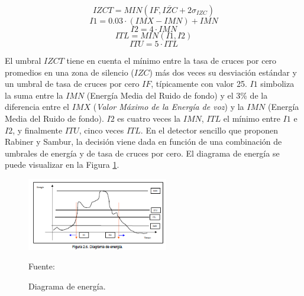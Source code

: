 \begin{enumerate}
\begin{enumerate}
\begin{equation}
\label{eq:ecuacion27}
IZCT = MIN(IF,\overline{IZC} + 2\sigma _{IZC})
\end{equation}
\vskip -1.5cm
\begin{equation}
\label{eq:ecuacion28}
I1 = 0.03\cdot(IMX-IMN) + IMN
\end{equation}
\vskip -1.5cm
\begin{equation}
\label{eq:ecuacion29}
I2 = 4 \cdot IMN
\end{equation}
\vskip -1.5cm
\begin{equation}
\label{eq:ecuacion30}
ITL = MIN(I1,I2)
\end{equation}
\vskip -1.5cm
\begin{equation}
\label{eq:ecuacion31}
ITU = 5 \cdot ITL
\end{equation}

El umbral $IZCT$ tiene en cuenta el mínimo entre la tasa de cruces por cero promedios en una zona de silencio ($IZC$) más dos veces su desviación estándar y un umbral de tasa de cruces por cero $IF$, típicamente con valor 25. $I1$ simboliza la suma entre la $IMN$ (Energía Media del Ruido de fondo) y el 3\% de la diferencia entre el $IMX$ (\textit{Valor Máximo de la Energía de voz}) y la $IMN$ (Energía Media del Ruido de fondo). $I2$ es cuatro veces la $IMN$, $ITL$ el mínimo entre $I1$ e $I2$, y finalmente $ITU$, cinco veces $ITL$.
\vskip 0.5cm
En el detector sencillo que proponen Rabiner y Sambur, la decisión viene dada en función de una combinación de umbrales de energía y de tasa de cruces por cero. El diagrama de energía se puede visualizar en la Figura \ref{fig:figura2.26}.

\begin{figure}[ht]
\begin{center}
\includegraphics[width=0.55\textwidth]{Imagenes/Cap2/image027}
\end{center}
\begin{center}
\vskip -0.5cm
\caption{\small{Diagrama de energía.}}
\label{fig:figura2.26}
{\small{Fuente: \cite{varela}}}
\end{center}
\end{figure}


\end{enumerate}
\end{enumerate}
